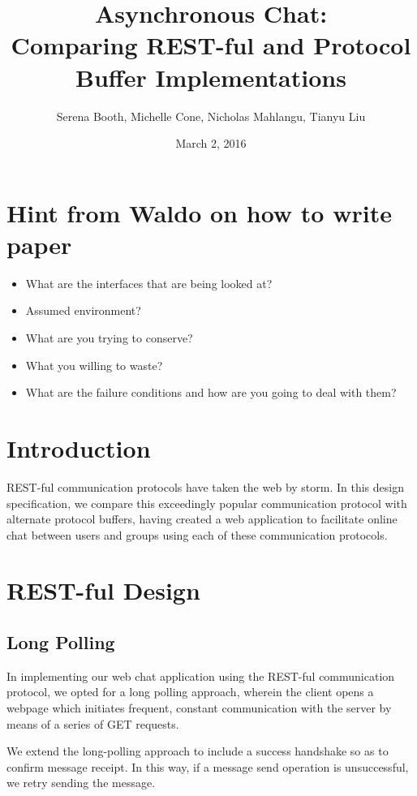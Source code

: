 \documentclass[11pt]{article} %
\title{Asynchronous Chat: \\ Comparing REST-ful and Protocol Buffer Implementations}
\author{Serena Booth, Michelle Cone, Nicholas Mahlangu, Tianyu Liu}
\date{March 2, 2016} %
\begin{document}
\maketitle

\section{Hint from Waldo on how to write paper}
\begin{itemize}
\item What are the interfaces that are being looked at?
\item Assumed environment?
\item What are you trying to conserve?
\item What you willing to waste?
\item What are the failure conditions and how are you going to deal with them?
\end{itemize}

\section{Introduction}

REST-ful communication protocols have taken the web by storm. In this design specification, we compare this exceedingly popular communication protocol with alternate protocol buffers,  having created a web application to facilitate online chat between users and groups using each of these communication protocols. 

\section{REST-ful Design}

\subsection{Long Polling} 


 In implementing our web chat application using the REST-ful communication protocol, we opted for a long polling approach, wherein the client opens a webpage which initiates frequent, constant communication with the server by means of a series of GET requests. 
 
We extend the long-polling approach to include a success handshake so as to confirm message receipt. In this way, if a message send operation is unsuccessful, we retry sending the message.
\end{document}
